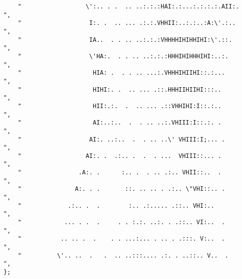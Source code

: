 \begin{lstlisting}
	"                  \':.. . .  .. ..:.:.:HAI:.:...:.:.:.:.AII:.            ",
	"                   I:. .  .. ... .:.:.VHHII:..:.:..:A:\'.:..             ",
	"                   IA..  . . .. ..:.:.:VHHHHIHIHHIHI:\'.::.              ",
	"                   \'HA:.  . . .. ..:.:.:HHHIHIHHHIHI:..:.               ",
	"                    HIA: .  . . .. ...:.VHHHIHIIHI::.:...               ",
	"                    HIHI:. .  .. ... .::.HHHIIHIIHI:::..                ",
	"                    HII:.:.  .  .. ... .::VHHIHI:I::.:..                ",
	"                    AI:..:..  .  . .. ..:.VHIII:I::.:. .                ",
	"                   AI:. ..:..  .  . .. ..\' VHIII:I;... .                ",
	"                  AI:. .  .:.. .  .  . ...  VHIII::... .                ",
	"                .A:. .      :.. .  . .. .:.. VHII::..  .                ",
	"               A:. . .       ::. .. .. . .:.. \"VHI::.. .                ",
	"             .:.. .  .        :.. .:..... .::.. VHI:..                  ",
	"            ... . .  .     . . :.:. ..:. . .::.. VI:..  .               ",
	"           .. .. .  .    . . ...:... . .. . .:::. V:..  .               ",
	"          \'.. ..  .   .  .. ..:::.... .:. . ..::.. V..  .               ",
};


\end{lstlisting}
